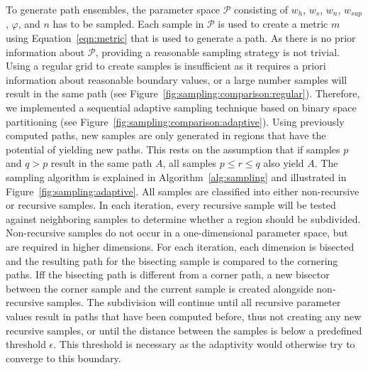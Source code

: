 \documentclass{egpubl}
\begin{document}
To generate path ensembles, the parameter space $\mathcal{P}$ consisting of $w_h$, $w_s$, $w_n$, $w_{sup}$, $\varphi$, and $n$ has to be sampled. Each sample in $\mathcal{P}$ is used to create a metric $m$ using Equation~\ref{eqn:metric} that is used to generate a path. As there is no prior information about $\mathcal{P}$, providing a reasonable sampling strategy is not trivial. Using a regular grid to create samples is insufficient as it requires a priori information about reasonable boundary values, or a large number samples will result in the same path (see Figure~\ref{fig:sampling:comparison:regular}). Therefore, we implemented a sequential adaptive sampling technique based on binary space partitioning (see Figure~\ref{fig:sampling:comparison:adaptive}). Using previously computed paths, new samples are only generated in regions that have the potential of yielding new paths. This rests on the assumption that if samples $p$ and $q > p$ result in the same path $A$, all samples $p \leq r \leq q$ also yield $A$. The sampling algorithm is explained in Algorithm~\ref{alg:sampling} and illustrated in Figure~\ref{fig:sampling:adaptive}. All samples are classified into either non-recursive or recursive samples. In each iteration, every recursive sample will be tested against neighboring samples to determine whether a region should be subdivided. Non-recursive samples do not occur in a one-dimensional parameter space, but are required in higher dimensions. For each iteration, each dimension is bisected and the resulting path for the bisecting sample is compared to the cornering paths. Iff the bisecting path is different from a corner path, a new bisector between the corner sample and the current sample is created alongside non-recursive samples. The subdivision will continue until all recursive parameter values result in paths that have been computed before, thus not creating any new recursive samples, or until the distance between the samples is below a predefined threshold $\epsilon$. This threshold is necessary as the adaptivity would otherwise try to converge to this boundary.
\end{document}
